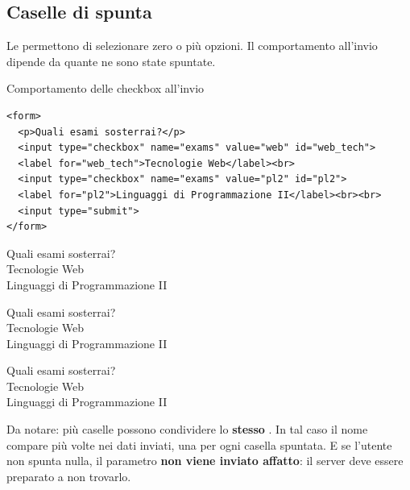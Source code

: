 \subsection{Caselle di spunta}

Le  permettono di selezionare zero o più opzioni. Il
comportamento all'invio dipende da quante ne sono state spuntate.

\begin{esempio}{Comportamento delle checkbox all'invio}
\begin{affianco}[0.58]
\codicepiccolo
\begin{lstlisting}[style=html, name=checkbox.html]
<form>
  <p>Quali esami sosterrai?</p>
  <input type="checkbox" name="exams" value="web" id="web_tech">
  <label for="web_tech">Tecnologie Web</label><br>
  <input type="checkbox" name="exams" value="pl2" id="pl2">
  <label for="pl2">Linguaggi di Programmazione II</label><br><br>
  <input type="submit">
</form>
\end{lstlisting}
\risultato
\begin{browser}
  Quali esami sosterrai?\\[2pt]
   Tecnologie Web\\
   Linguaggi di Programmazione II\\[3pt]
\end{browser}
\begin{browser}
  Quali esami sosterrai?\\[2pt]
   Tecnologie Web\\
   Linguaggi di Programmazione II\\[3pt]
\end{browser}
\begin{browser}
  Quali esami sosterrai?\\[2pt]
   Tecnologie Web\\
   Linguaggi di Programmazione II\\[3pt]
\end{browser}
\end{affianco}

Da notare: più caselle possono condividere lo \textbf{stesso} . In tal
caso il nome compare più volte nei dati inviati, una per ogni casella spuntata. E
se l'utente non spunta nulla, il parametro \textbf{non viene inviato affatto}: il
server deve essere preparato a non trovarlo.
\end{esempio}


